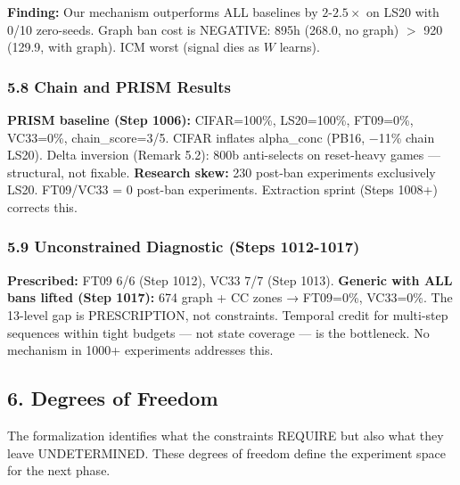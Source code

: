 \documentclass[
  11pt,
]{article}
\begin{document}
\textbf{Finding:} Our mechanism outperforms ALL baselines by
\(2\text{-}2.5\times\) on LS20 with 0/10 zero-seeds. Graph ban cost is
NEGATIVE: 895h (268.0, no graph) \(>\) 920 (129.9, with graph). ICM
worst (signal dies as \(W\) learns).

\subsubsection{5.8 Chain and PRISM
Results}\label{chain-and-prism-results}

\textbf{PRISM baseline (Step 1006):} CIFAR=100\%, LS20=100\%, FT09=0\%,
VC33=0\%, chain\_score=3/5. CIFAR inflates alpha\_conc (PB16, −11\%
chain LS20). Delta inversion (Remark 5.2): 800b anti-selects on
reset-heavy games --- structural, not fixable. \textbf{Research skew:}
230 post-ban experiments exclusively LS20. FT09/VC33 = 0 post-ban
experiments. Extraction sprint (Steps 1008+) corrects this.

\subsubsection{5.9 Unconstrained Diagnostic (Steps
1012-1017)}\label{unconstrained-diagnostic-steps-1012-1017}

\textbf{Prescribed:} FT09 6/6 (Step 1012), VC33 7/7 (Step 1013).
\textbf{Generic with ALL bans lifted (Step 1017):} 674 graph + CC zones
→ FT09=0\%, VC33=0\%. The 13-level gap is PRESCRIPTION, not constraints.
Temporal credit for multi-step sequences within tight budgets --- not
state coverage --- is the bottleneck. No mechanism in 1000+ experiments
addresses this.

\subsection{6. Degrees of Freedom}\label{degrees-of-freedom}

The formalization identifies what the constraints REQUIRE but also what
they leave UNDETERMINED. These degrees of freedom define the experiment
space for the next phase.
\end{document}

